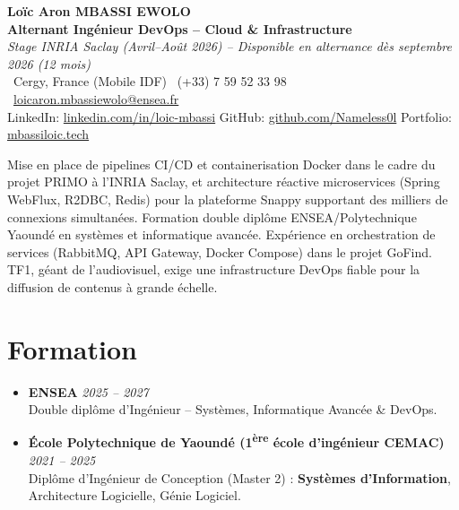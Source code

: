 \documentclass[a4paper,11pt]{article}
\begin{document}
\begin{center}
    {\Large \textbf{Lo\"ic Aron MBASSI EWOLO}} \\ \vspace{4pt}
    \textbf{\large Alternant Ing\'enieur DevOps -- Cloud \& Infrastructure} \\
    \textit{\small Stage INRIA Saclay (Avril--Ao\^ut 2026) -- Disponible en alternance d\`es septembre 2026 (12 mois)} \\ \vspace{4pt}
    \small
    \Pointinghand\ Cergy, France (Mobile IDF) \quad \Mobilefone\ (+33) 7 59 52 33 98 \quad
    {\color{primary}\Letter\ \href{mailto:loicaron.mbassiewolo@ensea.fr}{loicaron.mbassiewolo@ensea.fr}} \\ \vspace{2pt}
    {\color{primary}LinkedIn: \href{https://www.linkedin.com/in/loic-mbassi/}{linkedin.com/in/loic-mbassi}} \quad
    {\color{primary}GitHub: \href{https://github.com/Nameless0l}{github.com/Nameless0l}} \quad
    {\color{primary}Portfolio: \href{https://mbassiloic.tech}{mbassiloic.tech}}
\end{center}
\vspace{-6pt}
\noindent\small{Mise en place de pipelines CI/CD et containerisation Docker dans le cadre du projet PRIMO \`a l'INRIA Saclay, et architecture r\'eactive microservices (Spring WebFlux, R2DBC, Redis) pour la plateforme Snappy supportant des milliers de connexions simultan\'ees. Formation double dipl\^ome ENSEA/Polytechnique Yaound\'e en syst\`emes et informatique avanc\'ee. Exp\'erience en orchestration de services (RabbitMQ, API Gateway, Docker Compose) dans le projet GoFind. TF1, g\'eant de l'audiovisuel, exige une infrastructure DevOps fiable pour la diffusion de contenus \`a grande \'echelle.}

\section{Formation}
\begin{itemize}[leftmargin=*, label=\tiny$\bullet$, nosep]
    \item \textbf{ENSEA} \hfill \textit{2025 -- 2027} \\
    \small{Double dipl\^ome d'Ing\'enieur -- Syst\`emes, Informatique Avanc\'ee \& DevOps.}
    \item \textbf{\'Ecole Polytechnique de Yaound\'e (1\textsuperscript{\`ere} \'ecole d'ing\'enieur CEMAC)} \hfill \textit{2021 -- 2025} \\
    \small{Dipl\^ome d'Ing\'enieur de Conception (Master 2) : \textbf{Syst\`emes d'Information}, Architecture Logicielle, G\'enie Logiciel.}
\end{itemize}
\end{document}
